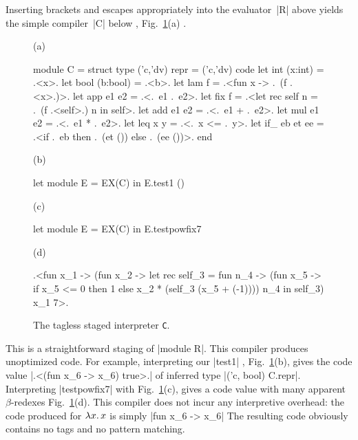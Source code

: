 Inserting brackets and escapes appropriately into the
evaluator~|R| above yields the simple compiler~|C| below%
, Fig.~\ref{fig:interpreter-C}(a)
.
%
\begin{figure}[t]
(a) \begin{code2}
module C = struct type ('c,'dv) repr = ('c,'dv) code
  let int (x:int)   = .<x>.           let bool (b:bool) = .<b>.
  let lam f         = .<fun x -> .~(f .<x>.)>.
  let app e1 e2     = .<.~e1 .~e2>.
  let fix f =  .<let rec self n = .~(f .<self>.) n in self>.
  let add e1 e2     = .<.~e1 + .~e2>. let mul e1 e2     = .<.~e1 * .~e2>.
  let leq x y       = .<.~x <= .~y>.
  let if_ eb et ee  = .<if .~eb then .~(et ()) else .~(ee ())>. end
\end{code2}

(b) \begin{code2}
let module E = EX(C) in E.test1 ()
\end{code2}

(c) \begin{code2}
let module E = EX(C) in E.testpowfix7
\end{code2}

(d) \begin{code2}
.<fun x_1 -> (fun x_2 -> let rec self_3 = fun n_4 ->
   (fun x_5 -> if x_5 <= 0 then 1  else x_2 * (self_3 (x_5 + (-1))))
   n_4 in self_3) x_1 7>.
\end{code2}
\caption{The tagless staged interpreter \texttt{C}.}
\label{fig:interpreter-C}
\end{figure}
%
This is a straightforward staging of
|module R|.
This compiler produces
unoptimized code. For example, interpreting our |test1|%
, Fig.~\ref{fig:interpreter-C}(b),
gives the code value |.<(fun x_6 -> x_6) true>.|
of inferred type |('c, bool) C.repr|.  Interpreting |testpowfix7|
with
Fig.~\ref{fig:interpreter-C}(c),
gives a code value with many apparent $\beta$-redexes
Fig.~\ref{fig:interpreter-C}(d).
This compiler does not incur
any interpretive overhead: the
code produced for $\mathopen{\lambda\mathord{x}.\,}x$ is simply |fun x_6 -> x_6| 
The resulting code obviously contains no tags and no pattern matching.
